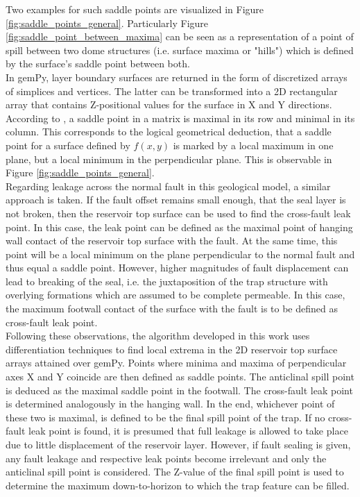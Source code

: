 			Two examples for such saddle points are visualized in Figure \ref{fig:saddle_points_general}. Particularly Figure \ref{fig:saddle_point_between_maxima} can be seen as a representation of a point of spill between two dome structures (i.e. surface maxima or "hills") which is defined by the surface's saddle point between both.\\			
			In gemPy, layer boundary surfaces are returned in the form of discretized arrays of simplices and vertices. The latter can be transformed into a 2D rectangular array that contains Z-positional values for the surface in X and Y directions. According to \citet{verschelde2017programmingtools}, a saddle point in a matrix is maximal in its row and minimal in its column. This corresponds to the logical geometrical deduction, that a saddle point for a surface defined by $f(x,y)$ is marked by a local maximum in one plane, but a local minimum in the perpendicular plane. This is observable in Figure \ref{fig:saddle_points_general}.\\
			Regarding leakage across the normal fault in this geological model, a similar approach is taken. If the fault offset remains small enough, that the seal layer is not broken, then the reservoir top surface can be used to find the cross-fault leak point. In this case, the leak point can be defined as the maximal point of hanging wall contact of the reservoir top surface with the fault. At the same time, this point will be a local minimum on the plane perpendicular to the normal fault and thus equal a saddle point. However, higher magnitudes of fault displacement can lead to breaking of the seal, i.e. the juxtaposition of the trap structure with overlying formations which are assumed to be complete permeable. In this case, the maximum footwall contact of the surface with the fault is to be defined as cross-fault leak point.\\
			Following these observations, the algorithm developed in this work uses differentiation techniques to find local extrema in the 2D reservoir top surface arrays attained over gemPy. Points where minima and maxima of perpendicular axes X and Y coincide are then defined as saddle points. The anticlinal spill point is deduced as the maximal saddle point in the footwall. The cross-fault leak point is determined analogously in the hanging wall. In the end, whichever point of these two is maximal, is defined to be the final spill point of the trap. If no cross-fault leak point is found, it is presumed that full leakage is allowed to take place due to little displacement of the reservoir layer. However, if fault sealing is given, any fault leakage and respective leak points become irrelevant and only the anticlinal spill point is considered. The Z-value of the final spill point is used to determine the maximum down-to-horizon to which the trap feature can be filled.\\
